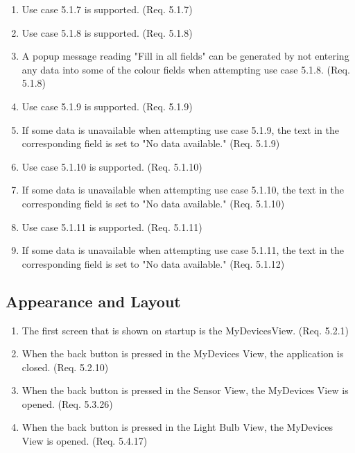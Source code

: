 \documentclass[a4paper]{article}
\newlength{\testlabellength}
\newenvironment{testlist}{\begin{enumerate}[label=\bfseries Test \thesubsection.\arabic* , labelindent=0pt, labelwidth=\testlabellength , leftmargin=2cm]}{\end{enumerate}}
\begin{document}
\begin{appendices}
\begin{testlist}
	\item Use case 5.1.7 is supported. (Req. 5.1.7)
	
	\item Use case 5.1.8 is supported. (Req. 5.1.8)
	
	\item A popup message reading "Fill in all fields" can be generated by not entering any data into some of the colour fields when attempting use case 5.1.8. (Req. 5.1.8)
	
	\item Use case 5.1.9 is supported. (Req. 5.1.9)
	
	\item If some data is unavailable when attempting use case 5.1.9, the text in the corresponding field is set to "No data available." (Req. 5.1.9)
	
	\item Use case 5.1.10 is supported. (Req. 5.1.10)
	
	\item If some data is unavailable when attempting use case 5.1.10, the text in the corresponding field is set to "No data available." (Req. 5.1.10)
	
	\item Use case 5.1.11 is supported. (Req. 5.1.11)
	
	\item If some data is unavailable when attempting use case 5.1.11, the text in the corresponding field is set to "No data available." (Req. 5.1.12)
\end{testlist}

\subsection{Appearance and Layout}

\begin{testlist}
	\item The first screen that is shown on startup is the MyDevicesView. (Req. 5.2.1)
	
	\item When the back button is pressed in the MyDevices View, the application is closed. (Req. 5.2.10)	
	
	\item When the back button is pressed in the Sensor View, the MyDevices View is opened. (Req. 5.3.26)
	
	\item When the back button is pressed in the Light Bulb View, the MyDevices View is opened. (Req. 5.4.17)
	

\end{testlist}
\end{appendices}
\end{document}

